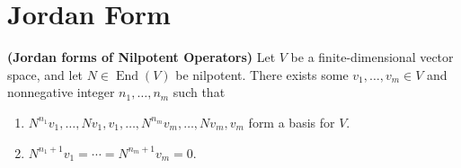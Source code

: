 \documentclass{report}
\begin{document}
\section{Jordan Form}
\label{JF}
\begin{theorem}
\label{JfNO}
\textbf{(Jordan forms of Nilpotent Operators)} Let $V$ be a finite-dimensional vector space, and let  $N \in \operatorname{End}(V)$ be nilpotent. There exists some $v_1,\dots ,v_m \in V$ and nonnegative integer $n_1,\dots ,n_m$ such that 
\begin{enumerate}[label=(\alph*)]
  \item $N^{n_1}v_1,\dots ,Nv_1,v_1,\dots ,N^{n_m}v_m,\dots ,Nv_m,v_m$ form a basis for $V$. 
  \item $N^{n_1+1}v_1=\cdots = N^{n_m+1}v_m=0$. 
\end{enumerate}
\end{theorem}
\end{document}

